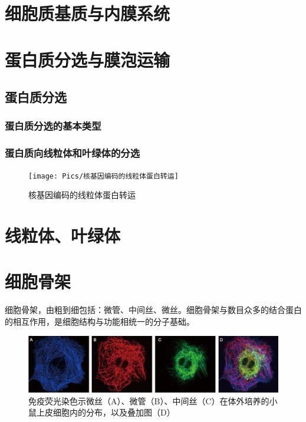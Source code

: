 \section{细胞质基质与内膜系统}

\section{蛋白质分选与膜泡运输}

\subsection{蛋白质分选}

\subsubsection{蛋白质分选的基本类型}

\subsubsection{蛋白质向线粒体和叶绿体的分选}

\begin{figure}[htbp]
	\centering
	\texttt{[image: Pics/核基因编码的线粒体蛋白转运]}
	\caption{核基因编码的线粒体蛋白转运}
	\label{fig:tim_tom}
\end{figure}




\section{线粒体、叶绿体}



\section{细胞骨架}

细胞骨架，由粗到细包括：微管、中间丝、微丝。细胞骨架与数目众多的结合蛋白的相互作用，是细胞结构与功能相统一的分子基础。

\begin{figure}[h]
	\centering
	\includegraphics[width=0.9\linewidth]{Pics/cytoskeleton}
	\caption{免疫荧光染色示微丝（A）、微管（B）、中间丝（C）在体外培养的小鼠上皮细胞内的分布，以及叠加图（D）}
	\label{fig:cytoskeleton}
\end{figure}



